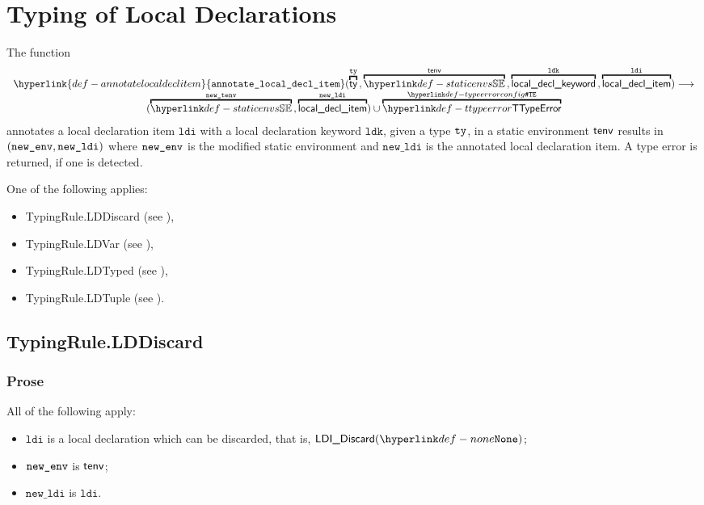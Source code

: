 \documentclass{book}
\newcommand\annotatelocaldeclitem[1]{\hyperlink{def-annotatelocaldeclitem}{\texttt{annotate\_local\_decl\_item}}(#1)}
\newcommand\newtenv[0]{\texttt{new\_tenv}}
\newcommand\ldi[0]{\texttt{ldi}}
\newcommand\ldk[0]{\texttt{ldk}}
\newcommand\newldi[0]{\texttt{new\_ldi}}
\begin{document}

\chapter{Typing of Local Declarations}
\hypertarget{def-annotatelocaldeclitem}{}
The function
\[
  \begin{array}{c}
  \annotatelocaldeclitem{
    \overname{\ty}{\tty} \aslsep
    \overname{\staticenvs}{\tenv} \aslsep
    \overname{\localdeclkeyword}{\ldk} \aslsep
    \overname{\localdeclitem}{\ldi}
   } \aslto\\
  (\overname{\staticenvs}{\newtenv} \aslsep \overname{\localdeclitem}{\newldi})
  \cup \overname{\TTypeError}{\TypeErrorConfig}
  \end{array}
\]
annotates a local declaration item $\ldi$ with a local declaration keyword $\ldk$, given a type $\texttt{ty}$,
in a static environment $\textsf{tenv}$ results in $(\newenv, \newldi)$ where $\texttt{new\_env}$ is the modified
static environment and $\newldi$ is the annotated local declaration item.
A type error is returned, if one is detected.

One of the following applies:
\begin{itemize}
\item TypingRule.LDDiscard (see ),
\item TypingRule.LDVar (see ),
\item TypingRule.LDTyped (see ),
\item TypingRule.LDTuple (see ).
\end{itemize}


\section{TypingRule.LDDiscard \label{sec:TypingRule.LDDiscard}}

\subsection{Prose}
All of the following apply:
\begin{itemize}
  \item $\ldi$ is a local declaration which can be discarded, that is, $\LDIDiscard(\None)$;
  \item $\texttt{new\_env}$ is $\textsf{tenv}$;
  \item $\newldi$ is $\ldi$.
\end{itemize}
\end{document}
